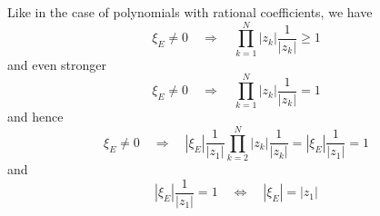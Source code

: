 Like in the case of polynomials with rational coefficients,
we have
\begin{equation}
  \xi_E\ne 0
  \quad\Rightarrow\quad
  \prod_{k=1}^N |z_k|\frac{1}{|z_k|}
  \ge
  1  
\end{equation}
and even stronger
\begin{equation}
  \xi_E\ne 0
  \quad\Rightarrow\quad
  \prod_{k=1}^N |z_k|\frac{1}{|z_k|}
  =
  1  
\end{equation}
and hence
\begin{equation}
  \xi_E\ne 0
  \quad\Rightarrow\quad
  |\xi_E|\frac{1}{|z_1|}\prod_{k=2}^N |z_k|\frac{1}{|z_k|}
  = 
  |\xi_E|\frac{1}{|z_1|}
  = 
  1
\end{equation}
and
\begin{equation}
  |\xi_E|\frac{1}{|z_1|} = 1
  \quad\Leftrightarrow\quad
  |\xi_E| = |z_1|
\end{equation}

